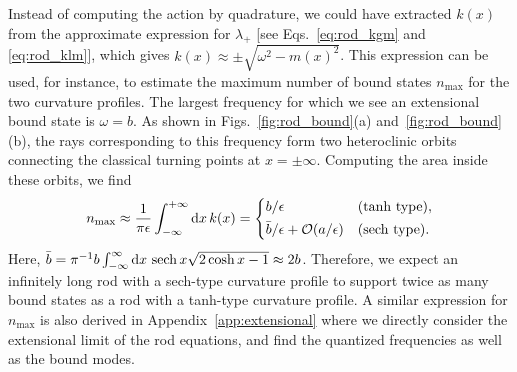 Instead of computing the action by quadrature, we could have extracted $k(x)$ from the approximate expression for $\lambda_{+}$ [see Eqs.~\eqref{eq:rod_kgm} and \eqref{eq:rod_klm}], which gives $k(x) \approx \pm\sqrt{\omega^{2} - m(x)^{2}}$.
This expression can be used, for instance, to estimate the maximum number of bound states $n_{\text{max}}$ for the two curvature profiles.
The largest frequency for which we see an extensional bound state is $\omega = b$.
As shown in Figs.~\ref{fig:rod_bound}(a) and~\ref{fig:rod_bound}(b), the rays corresponding to this frequency form two heteroclinic orbits connecting the classical turning points at $x = \pm \infty$.
Computing the area inside these orbits, we find
%
\begin{equation}
  n_{\text{max}} \approx \frac{1}{\pi\epsilon}\int_{-\infty}^{+\infty} \mathrm{d}{x}\,k(x) =
  \begin{dcases}
    b/\epsilon & \text{(tanh type)},\\
    \bar{b}/\epsilon + \mathcal{O}(a/\epsilon) & \text{(sech type)}.
  \end{dcases}
  \label{eq:rod_maxb}
\end{equation}
%
Here, $\bar{b} = \pi^{-1}b\int_{-\infty}^{\infty}\mathrm{d}{x}\,\operatorname{sech}{x}\sqrt{2\cosh{x} - 1} \approx 2b$.
Therefore, we expect an infinitely long rod with a sech-type curvature profile to support twice as many bound states as a rod with a tanh-type curvature profile.
A similar expression for $n_\text{max}$ is also derived in Appendix~\ref{app:extensional} where we directly consider the extensional limit of the rod equations, and find the quantized frequencies as well as the bound modes.

